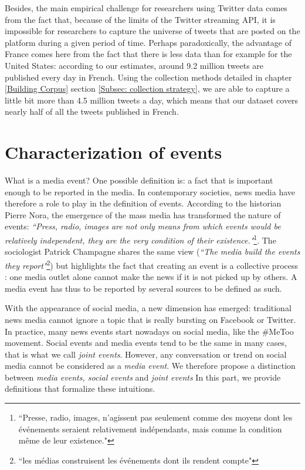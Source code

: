 Besides, the main empirical challenge for researchers
using Twitter data comes from the fact that, because of the limits of the Twitter streaming
API, it is impossible for researchers to capture the universe of tweets that are posted on the
platform during a given period of time. Perhaps paradoxically, the advantage of France comes
here from the fact that there is less data than for example for the United States: according to our estimates, around 9.2 million tweets are published every day in French. Using the collection methods detailed in chapter \ref{Building Corpus} section \ref{Subsec: collection strategy}, we are able to capture a little bit more than 4.5 million tweets a day, which means that our dataset covers nearly half of all the tweets published in French.

\section{Characterization of events}
\color{orange}
What is a media event? One possible definition is: a fact that is important enough to be reported in the media. In contemporary societies, news media have therefore a role to play in the definition of events.  According to the historian Pierre Nora, the emergence of the mass media has transformed the nature of events: \textit{``Press, radio, images are not only means from which events would be relatively independent, they are the very condition of their existence."}\footnote{``Presse, radio, images, n'agissent pas seulement comme des moyens dont les événements seraient relativement indépendants, mais comme la condition même de leur existence."}\citep{nora_evenement_1972}. The sociologist Patrick Champagne \citep{champagne_evenement_2000} shares the same view (\textit{``The media build the events they report"}\footnote{``les médias construisent les événements dont ils rendent compte"}) but highlights the fact that creating an event is a collective process : one media outlet alone cannot make the news if it is not picked up by others. A media event has thus to be reported by several sources to be defined as such.


With the appearance of social media, a new dimension has emerged: traditional news media cannot ignore a topic that is really bursting on Facebook or Twitter. In practice, many news events start nowadays on social media, like the \#MeToo movement.  Social events and media events tend to be the same in many cases, that is what we call \textit{joint events}. However, any conversation or trend on social media cannot be considered as a \textit{media event}. We therefore propose a distinction between \textit{media events, social events} and \textit{joint events} In this part, we  provide definitions that formalize these intuitions.

